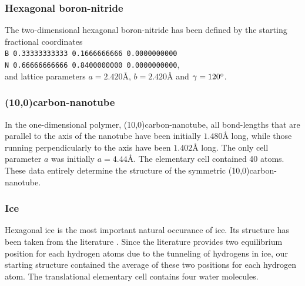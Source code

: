 \documentclass[prl,aps,preprint,superbib,12pt]{revtex4}
\begin{document}
\subsubsection{Hexagonal boron-nitride}
The two-dimensional hexagonal boron-nitride has been 
defined by the starting fractional coordinates
\\
{\tt B 0.33333333333 0.1666666666 0.0000000000} \\
{\tt N 0.66666666666 0.8400000000 0.0000000000}, \\
and lattice parameters $a=2.420${\AA}, $b=2.420${\AA} and 
$\gamma=120^{\rm o}$.

\subsubsection{(10,0)carbon-nanotube}
In the one-dimensional polymer, (10,0)carbon-nanotube,
all bond-lengths that are parallel to the axis of the
nanotube have been initially $1.480${\AA} long, while those
running perpendicularly to the axis have been $1.402${\AA} long.
The only cell parameter $a$ was initially $a=4.44${\AA}. The
elementary cell contained 40 atoms. These data entirely determine
the structure of the symmetric (10,0)carbon-nanotube.

\subsubsection{Ice}
Hexagonal ice is the most important natural occurance of ice.
Its structure has been taken from the literature \cite{AGoto90}. 
Since the literature provides two equilibrium position
for each hydrogen atoms due to the tunneling of hydrogens in ice,
our starting structure contained the average of these two positions
for each hydrogen atom. The translational elementary cell contains
four water molecules.
\end{document}
